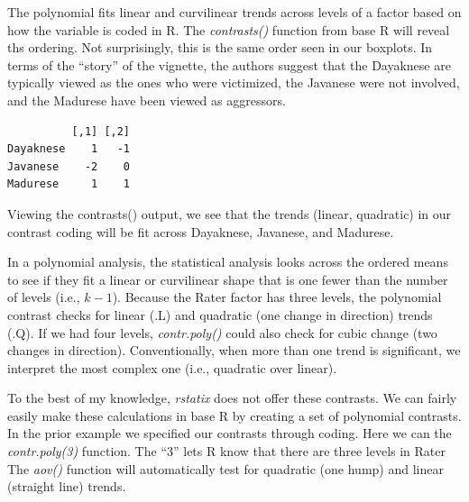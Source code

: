 \documentclass[
  11pt,
]{book}
\newenvironment{Shaded}{\begin{snugshade}}{\end{snugshade}}
\newcommand{\AttributeTok}[1]{\textcolor[rgb]{0.27,0.27,0.27}{#1}}
\newcommand{\DecValTok}[1]{\textcolor[rgb]{0.06,0.06,0.06}{#1}}
\newcommand{\FunctionTok}[1]{\textcolor[rgb]{0.27,0.27,0.27}{\textbf{#1}}}
\newcommand{\NormalTok}[1]{#1}
\newcommand{\OtherTok}[1]{\textcolor[rgb]{0.37,0.37,0.37}{#1}}
\newcommand{\SpecialCharTok}[1]{\textcolor[rgb]{0.43,0.43,0.43}{\textbf{#1}}}
\begin{document}
The polynomial fits linear and curvilinear trends across levels of a factor based on how the variable is coded in R. The \emph{contrasts()} function from base R will reveal ths ordering. Not surprisingly, this is the same order seen in our boxplots. In terms of the ``story'' of the vignette, the authors suggest that the Dayaknese are typically viewed as the ones who were victimized, the Javanese were not involved, and the Madurese have been viewed as aggressors.

\begin{Shaded}
\end{Shaded}

\begin{verbatim}
          [,1] [,2]
Dayaknese    1   -1
Javanese    -2    0
Madurese     1    1
\end{verbatim}

Viewing the contrasts() output, we see that the trends (linear, quadratic) in our contrast coding will be fit across Dayaknese, Javanese, and Madurese.

In a polynomial analysis, the statistical analysis looks across the ordered means to see if they fit a linear or curvilinear shape that is one fewer than the number of levels (i.e., \(k-1\)). Because the Rater factor has three levels, the polynomial contrast checks for linear (.L) and quadratic (one change in direction) trends (.Q). If we had four levels, \emph{contr.poly()} could also check for cubic change (two changes in direction). Conventionally, when more than one trend is significant, we interpret the most complex one (i.e., quadratic over linear).

To the best of my knowledge, \emph{rstatix} does not offer these contrasts. We can fairly easily make these calculations in base R by creating a set of polynomial contrasts. In the prior example we specified our contrasts through coding. Here we can the \emph{contr.poly(3)} function. The ``3'' lets R know that there are three levels in Rater The \emph{aov()} function will automatically test for quadratic (one hump) and linear (straight line) trends.

\begin{Shaded}
\end{Shaded}
\end{document}
